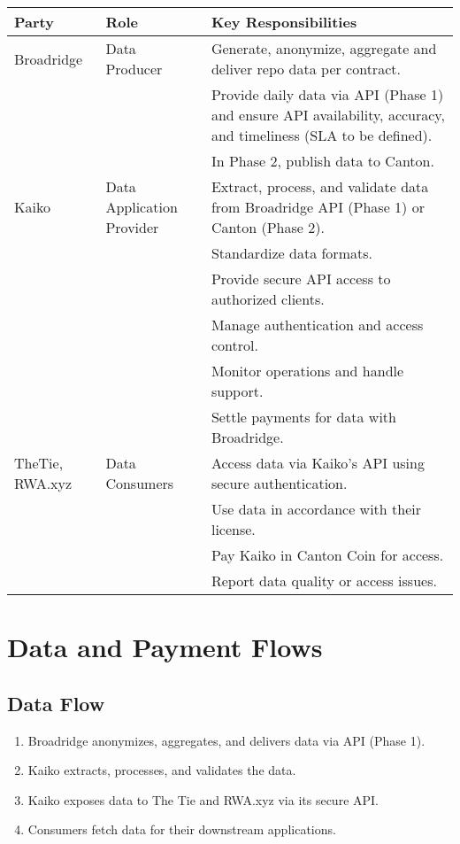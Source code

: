 \documentclass[12pt,a4paper]{article}
\begin{document}
\begin{table}[h!]
\centering
\begin{tabular}{p{} p{} p{}}
\toprule
\textbf{Party} & \textbf{Role} & \textbf{Key Responsibilities} \\
\midrule
Broadridge & Data Producer &
Generate, anonymize, aggregate and deliver repo data per contract.\\
& & Provide daily data via API (Phase 1) and ensure API availability, accuracy, and timeliness (SLA to be defined).\\
& & In Phase 2, publish data to Canton.\\
\addlinespace
Kaiko & Data Application Provider &
Extract, process, and validate data from Broadridge API (Phase 1) or Canton (Phase 2).\\
& & Standardize data formats.\\
& & Provide secure API access to authorized clients.\\
& & Manage authentication and access control.\\
& & Monitor operations and handle support.\\
& & Settle payments for data with Broadridge.\\
\addlinespace
TheTie, RWA.xyz & Data Consumers &
Access data via Kaiko's API using secure authentication.\\
& & Use data in accordance with their license.\\
& & Pay Kaiko in Canton Coin for access.\\
& & Report data quality or access issues.\\
\bottomrule
\end{tabular}
\end{table}

\section{Data and Payment Flows}

\subsection*{Data Flow}
\begin{enumerate}
    \item Broadridge anonymizes, aggregates, and delivers data via API (Phase 1).
    \item Kaiko extracts, processes, and validates the data.
    \item Kaiko exposes data to The Tie and RWA.xyz via its secure API.
    \item Consumers fetch data for their downstream applications.
\end{enumerate}
\end{document}
